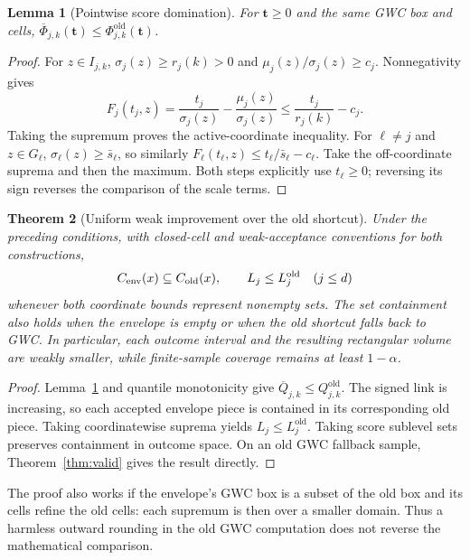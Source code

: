 \documentclass[11pt]{article}
\newtheorem{theorem}{Theorem}[section]
\newtheorem{lemma}[theorem]{Lemma}
\newcommand{\tvec}{\mathbf t}\newcommand{\zvec}{\mathbf z}\newcommand{\evec}{\mathbf e}
\begin{document}
\begin{lemma}[Pointwise score domination]\label{lem:domination}
For $\tvec\ge0$ and the same GWC box and cells,
$\overline\Phi_{j,k}(\tvec)\le\Phi^{\mathrm{old}}_{j,k}(\tvec)$.
\end{lemma}
\begin{proof}
For $z\in I_{j,k}$, $\sigma_j(z)\ge r_j(k)>0$ and
$\mu_j(z)/\sigma_j(z)\ge c_j$. Nonnegativity gives
\[
 F_j(t_j,z)=\frac{t_j}{\sigma_j(z)}-\frac{\mu_j(z)}{\sigma_j(z)}
 \le\frac{t_j}{r_j(k)}-c_j.
\]
Taking the supremum proves the active-coordinate inequality. For $\ell\ne j$
and $z\in G_\ell$, $\sigma_\ell(z)\ge\bar s_\ell$, so similarly
$F_\ell(t_\ell,z)\le t_\ell/\bar s_\ell-c_\ell$. Take the off-coordinate suprema
and then the maximum. Both steps explicitly use $t_\ell\ge0$; reversing its
sign reverses the comparison of the scale terms.
\end{proof}

\begin{theorem}[Uniform weak improvement over the old shortcut]\label{thm:dom}
Under the preceding conditions, with closed-cell and weak-acceptance conventions
for both constructions,
\[
 C_{\mathrm{env}}(x)\subseteq C_{\mathrm{old}}(x),\qquad
 L_j\le L_j^{\mathrm{old}}\quad(j\le d)
\]
whenever both coordinate bounds represent nonempty sets. The set containment
also holds when the envelope is empty or when the old shortcut falls back to
GWC. In particular, each outcome interval and the resulting rectangular volume
are weakly smaller, while finite-sample coverage remains at least $1-\alpha$.
\end{theorem}
\begin{proof}
Lemma~\ref{lem:domination} and quantile monotonicity give
$\overline Q_{j,k}\le Q^{\mathrm{old}}_{j,k}$. The signed link is increasing,
so each accepted envelope piece is contained in its corresponding old piece.
Taking coordinatewise suprema yields $L_j\le L_j^{\mathrm{old}}$. Taking score
sublevel sets preserves containment in outcome space. On an old GWC fallback
sample, Theorem~\ref{thm:valid} gives the result directly.
\end{proof}
The proof also works if the envelope's GWC box is a subset of the old box and
its cells refine the old cells: each supremum is then over a smaller domain.
Thus a harmless outward rounding in the old GWC computation does not reverse
the mathematical comparison.
\end{document}
